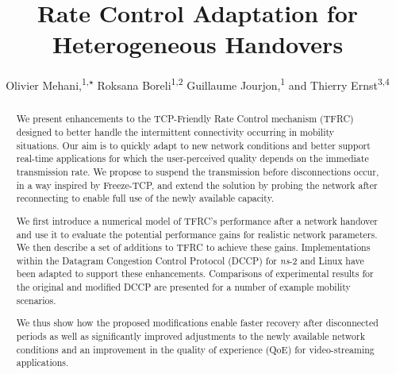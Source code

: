 \documentclass[twocolumn]{nictatechreport}
\newcommand{\theTitle}{Rate Control Adaptation for Heterogeneous Handovers}
\newcommand{\ns}{\textit{ns}}
\begin{document}
\title{\theTitle} 





\author{Olivier Mehani,\textsuperscript{1,$\star$} Roksana Boreli\textsuperscript{1,2} Guillaume Jourjon,\textsuperscript{1} and Thierry Ernst\textsuperscript{3,4}}   




\frontmatter \begin{abstract}

We present enhancements to the TCP-Friendly Rate Control mechanism (TFRC)
designed to better handle the intermittent connectivity occurring in mobility
situations. Our aim is to quickly adapt to new network conditions and better
support real-time applications for which the user-perceived quality depends on
the immediate transmission rate. We propose to suspend the transmission before
disconnections occur, in a way inspired by Freeze-TCP, and extend the solution by
probing the network after reconnecting to enable full use of the newly available
capacity.

We first introduce a numerical model of TFRC's performance after a network
handover and use it to evaluate the potential performance gains for realistic
network parameters.  We then describe a set of additions to TFRC to achieve
these gains.  Implementations within the Datagram Congestion Control Protocol
(DCCP) for \ns-2 and Linux have been adapted to support these enhancements.
Comparisons of experimental results for the original and modified DCCP are
presented for a number of example mobility scenarios.

We thus show how the proposed modifications enable faster recovery after
disconnected periods as well as significantly improved adjustments to the newly
available network conditions and an improvement in the quality of experience
(QoE) for video-streaming applications.

\end{abstract}
\end{document}
